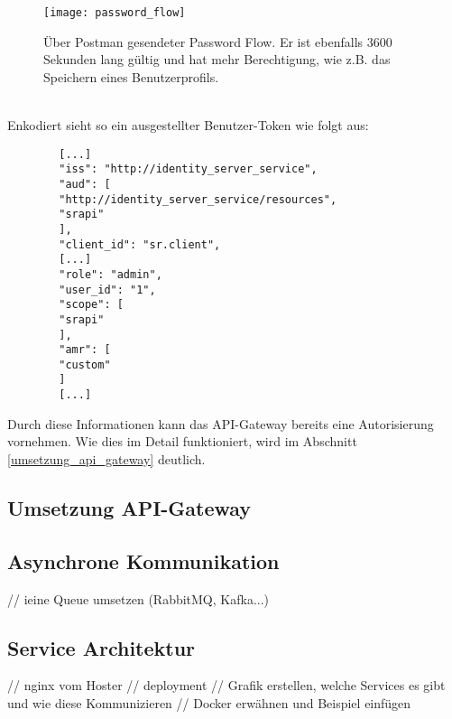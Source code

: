 \begin{figure}[!ht]
	\centering
	\texttt{[image: password\_flow]}
	\caption[Über Postman gesendeter Password Flow] {Über Postman gesendeter Password Flow. Er ist ebenfalls 3600 Sekunden lang gültig und hat mehr Berechtigung, wie z.B. das Speichern eines Benutzerprofils.}
	\label{fig:password_flow}
\end{figure} \\

Enkodiert sieht so ein ausgestellter Benutzer-Token wie folgt aus: \\

\begin{verbatim}
		[...]
		"iss": "http://identity_server_service",
		"aud": [
		"http://identity_server_service/resources",
		"srapi"
		],
		"client_id": "sr.client",
		[...]
		"role": "admin",
		"user_id": "1",
		"scope": [
		"srapi"
		],
		"amr": [
		"custom"
		]
		[...]
\end{verbatim}  

Durch diese Informationen kann das API-Gateway bereits eine Autorisierung vornehmen. Wie dies im Detail funktioniert, wird im Abschnitt \ref{umsetzung_api_gateway} deutlich. 

\subsection{Umsetzung API-Gateway}\label{sec:umsetzung_api_gateway}

\subsection{Asynchrone  Kommunikation}
// ieine Queue umsetzen (RabbitMQ, Kafka...)

\subsection{Service Architektur}
// nginx vom Hoster
// deployment
// Grafik erstellen, welche Services es gibt und wie diese Kommunizieren 
// Docker erwähnen und Beispiel einfügen




